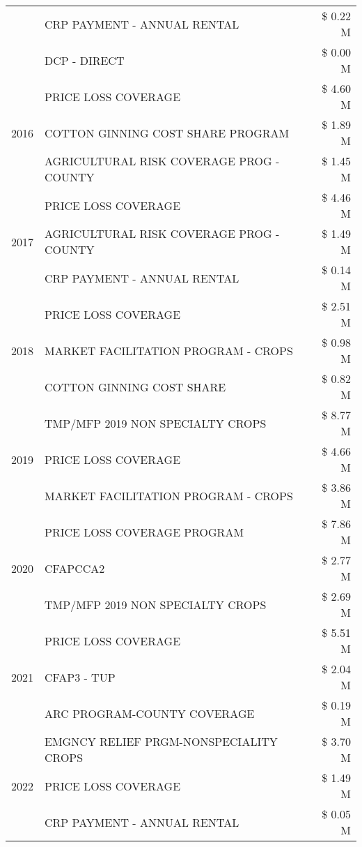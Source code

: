 \begin{tabular}{llr}
 & CRP PAYMENT - ANNUAL RENTAL & \$ 0.22 M \\
 & DCP - DIRECT & \$ 0.00 M \\
\cline{1-3}
\multirow[t]{3}{*}{2016} & PRICE LOSS COVERAGE & \$ 4.60 M \\
 & COTTON GINNING COST SHARE PROGRAM & \$ 1.89 M \\
 & AGRICULTURAL RISK COVERAGE PROG - COUNTY & \$ 1.45 M \\
\cline{1-3}
\multirow[t]{3}{*}{2017} & PRICE LOSS COVERAGE & \$ 4.46 M \\
 & AGRICULTURAL RISK COVERAGE PROG - COUNTY & \$ 1.49 M \\
 & CRP PAYMENT - ANNUAL RENTAL & \$ 0.14 M \\
\cline{1-3}
\multirow[t]{3}{*}{2018} & PRICE LOSS COVERAGE & \$ 2.51 M \\
 & MARKET FACILITATION PROGRAM - CROPS & \$ 0.98 M \\
 & COTTON GINNING COST SHARE & \$ 0.82 M \\
\cline{1-3}
\multirow[t]{3}{*}{2019} & TMP/MFP 2019 NON SPECIALTY CROPS & \$ 8.77 M \\
 & PRICE LOSS COVERAGE & \$ 4.66 M \\
 & MARKET FACILITATION PROGRAM - CROPS & \$ 3.86 M \\
\cline{1-3}
\multirow[t]{3}{*}{2020} & PRICE LOSS COVERAGE PROGRAM & \$ 7.86 M \\
 & CFAPCCA2 & \$ 2.77 M \\
 & TMP/MFP 2019 NON SPECIALTY CROPS & \$ 2.69 M \\
\cline{1-3}
\multirow[t]{3}{*}{2021} & PRICE LOSS COVERAGE & \$ 5.51 M \\
 & CFAP3 - TUP & \$ 2.04 M \\
 & ARC PROGRAM-COUNTY COVERAGE & \$ 0.19 M \\
\cline{1-3}
\multirow[t]{3}{*}{2022} & EMGNCY RELIEF PRGM-NONSPECIALITY CROPS & \$ 3.70 M \\
 & PRICE LOSS COVERAGE & \$ 1.49 M \\
 & CRP PAYMENT - ANNUAL RENTAL & \$ 0.05 M \\
\cline{1-3}
\bottomrule
\end{tabular}

